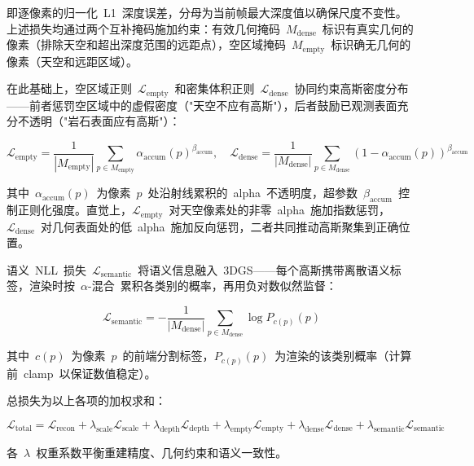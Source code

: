 即逐像素的归一化~L1~深度误差，分母为当前帧最大深度值以确保尺度不变性。上述损失均通过两个互补掩码施加约束：有效几何掩码~$M_{\text{dense}}$~标识有真实几何的像素（排除天空和超出深度范围的远距点），空区域掩码~$M_{\text{empty}}$~标识确无几何的像素（天空和远距区域）。

在此基础上，空区域正则~$\mathcal{L}_{\text{empty}}$~和密集体积正则~$\mathcal{L}_{\text{dense}}$~协同约束高斯密度分布——前者惩罚空区域中的虚假密度（"天空不应有高斯"），后者鼓励已观测表面充分不透明（"岩石表面应有高斯"）：

\begin{equation}
\mathcal{L}_{\text{empty}} = \frac{1}{|M_{\text{empty}}|}\sum_{p \in M_{\text{empty}}} \alpha_{\text{accum}}(p)^{\beta_{\text{accum}}}, \quad
\mathcal{L}_{\text{dense}} = \frac{1}{|M_{\text{dense}}|}\sum_{p \in M_{\text{dense}}} (1 - \alpha_{\text{accum}}(p))^{\beta_{\text{accum}}}
\end{equation}

其中~$\alpha_{\text{accum}}(p)$~为像素~$p$~处沿射线累积的~alpha~不透明度，超参数~$\beta_{\text{accum}}$~控制正则化强度。直觉上，$\mathcal{L}_{\text{empty}}$~对天空像素处的非零~alpha~施加指数惩罚，$\mathcal{L}_{\text{dense}}$~对几何表面处的低~alpha~施加反向惩罚，二者共同推动高斯聚集到正确位置。

语义~NLL~损失~$\mathcal{L}_{\text{semantic}}$~将语义信息融入~3DGS——每个高斯携带离散语义标签，渲染时按~$\alpha$-混合~累积各类别的概率，再用负对数似然监督：

\begin{equation}
\mathcal{L}_{\text{semantic}} = -\frac{1}{|M_{\text{dense}}|}\sum_{p \in M_{\text{dense}}} \log P_{c(p)}(p)
\end{equation}

其中~$c(p)$~为像素~$p$~的前端分割标签，$P_{c(p)}(p)$~为渲染的该类别概率（计算前~clamp~以保证数值稳定）。

总损失为以上各项的加权求和：

\begin{equation}
\mathcal{L}_{\text{total}} = \mathcal{L}_{\text{recon}} + \lambda_{\text{scale}}\mathcal{L}_{\text{scale}} + \lambda_{\text{depth}}\mathcal{L}_{\text{depth}} + \lambda_{\text{empty}}\mathcal{L}_{\text{empty}} + \lambda_{\text{dense}}\mathcal{L}_{\text{dense}} + \lambda_{\text{semantic}}\mathcal{L}_{\text{semantic}}
\end{equation}

各~$\lambda$~权重系数平衡重建精度、几何约束和语义一致性。

